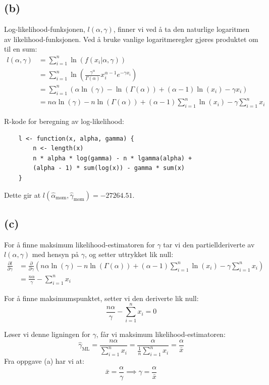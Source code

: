 \documentclass[11pt, a4paper]{article}
\begin{document}
\subsection*{(b)}
Log-likelihood-funksjonen, $l(\alpha, \gamma)$, finner vi ved å ta den naturlige logaritmen av likelihood-funksjonen. Ved å bruke vanlige logaritmeregler gjøres produktet om til en sum:
\begin{align*}
    l(\alpha, \gamma) 
    &= \sum_{i=1}^{n} \ln( f(x_i | \alpha, \gamma) ) \\
    &= \sum_{i=1}^{n} \ln \left( \frac{\gamma^\alpha}{\Gamma(\alpha)} x_i^{\alpha-1} e^{-\gamma x_i} \right) \\
    &= \sum_{i=1}^{n} \left( \alpha \ln(\gamma) - \ln(\Gamma(\alpha)) + (\alpha - 1) \ln(x_i) - \gamma x_i \right) \\
    &= n \alpha \ln(\gamma) - n \ln(\Gamma(\alpha)) + (\alpha - 1) \sum_{i=1}^{n} \ln(x_i) - \gamma \sum_{i=1}^{n} x_i
\end{align*}

\vspace{0.5cm}
R-kode for beregning av log-likelihood:
\begin{verbatim}
    l <- function(x, alpha, gamma) {
        n <- length(x)
        n * alpha * log(gamma) - n * lgamma(alpha) + 
        (alpha - 1) * sum(log(x)) - gamma * sum(x)
    }
\end{verbatim}

Dette gir at $l(\hat{\alpha}_{\text{mom}}, \hat{\gamma}_{\text{mom}}) = -27264.51$.


\subsection*{(c)}
For å finne maksimum likelihood-estimatoren for $\gamma$ tar vi den partiellderiverte av $l(\alpha, \gamma)$ med hensyn på $\gamma$, og setter uttrykket lik null:
\begin{align*}
\frac{\partial l}{\partial \gamma} &= \frac{\partial}{\partial \gamma} \left( n \alpha \ln(\gamma) - n \ln(\Gamma(\alpha)) + (\alpha - 1) \sum_{i=1}^{n} \ln(x_i) - \gamma \sum_{i=1}^{n} x_i \right) \\
&=\frac{n \alpha}{\gamma} - \sum_{i=1}^{n} x_i
\end{align*}

For å finne maksimumspunktet, setter vi den deriverte lik null:
$$
\frac{n \alpha}{\gamma} - \sum_{i=1}^{n} x_i = 0
$$

Løser vi denne ligningen for $\gamma$, får vi maksimum likelihood-estimatoren:
$$
\hat{\gamma}_{\text{ML}} = \frac{n \alpha}{\sum_{i=1}^{n} x_i} = \frac{\alpha}{\frac{1}{n} \sum_{i=1}^{n} x_i} = \frac{\alpha}{\bar{x}}
$$
Fra oppgave (a) har vi at:
$$
\bar{x} = \frac{\alpha}{\gamma} \implies \gamma = \frac{\alpha}{\bar{x}}
$$
\end{document}
